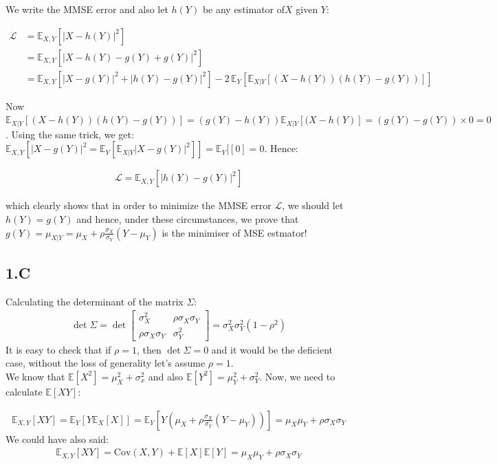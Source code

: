 \documentclass{article}
\begin{document}
We write the MMSE error and also let $h(Y)$ be any estimator of$X$ given $Y$:

\begin{align*}
    \mathcal{L} &= \mathbb{E}_{X,Y} [ | X - h(Y)|^2 ] \\
    &= \mathbb{E}_{X,Y} [ | X - h(Y) - g(Y) + g(Y)|^2 ] \\
    &= \mathbb{E}_{X,Y} [ | X - g(Y)|^2 + |h(Y) - g(Y)|^2 ] - 2 \, \mathbb{E}_{Y} \left[ \mathbb{E}_{X|Y} [ (X - h(Y))(h(Y) - g(Y)) ] \right]
\end{align*}

Now $\mathbb{E}_{X|Y} [(X-h(Y))(h(Y) - g(Y)) ] = (g(Y) - h(Y)) \mathbb{E}_{X|Y} [(X-h(Y)]  =   (g(Y) - g(Y)) \times 0 = 0 $. Using the same trick, we get:
$ 
\mathbb{E}_{X,Y} [ | X - g(Y)|^2 = \mathbb{E}_{Y} [ \mathbb{E}_{X|Y} | X - g(Y)|^2 ] ] = \mathbb{E}_{Y} [ [ 0 ] = 0
$. Hence:

\begin{align*}
    \mathcal{L} = \mathbb{E}_{X,Y} [ |h(Y) - g(Y)|^2] 
\end{align*}

which clearly shows that in order to minimize the MMSE error $\mathcal{L}$, we should let $h(Y) = g(Y)$ and hence, under these circumstances, we prove that $g(Y) = \mu_{X|Y} = \mu_X + \rho \frac{\sigma_X}{\sigma_Y}(Y - \mu_Y)$ is the minimiser of MSE estmator!

\subsection*{1.C}
Calculating the determinant of the matrix $\Sigma$:
\begin{align*}
\det \Sigma = \det
\begin{bmatrix}
    \sigma_X^2 & \rho\sigma_X\sigma_Y \\
    \rho\sigma_X\sigma_Y & \sigma_Y^2 
    \end{bmatrix} = \sigma_X^2\sigma_Y^2 (1- \rho^2)
\end{align*}
It is easy to check that if $\rho=1$, then $\det \Sigma=0$ and it would be the deficient case, without the loss of generality let's assume $\rho=1$.
\\
We know that $\mathbb{E} [X^2] = \mu_X^2 + \sigma_x^2$ and also $\mathbb{E} [Y^2] = \mu_Y^2 + \sigma_Y^2$. Now, we need to calculate $\mathbb{E} [XY]$:

\begin{align*}
\mathbb{E}_{X,Y} [XY] = \mathbb{E}_{Y} [ Y \mathbb{E}_{X} [X] ] = \mathbb{E}_{Y} [ Y (\mu_X + \rho \frac{\sigma_X}{\sigma_Y} (Y - \mu_Y) )] = \mu_X\mu_Y + \rho \sigma_X\sigma_Y
\end{align*}
We could have also said:
\begin{align*}
\mathbb{E}_{X,Y} [XY] = \text{Cov}(X,Y) + \mathbb{E}[X] \mathbb{E}[Y] = \mu_X\mu_Y + \rho \sigma_X\sigma_Y
\end{align*}
\end{document}
